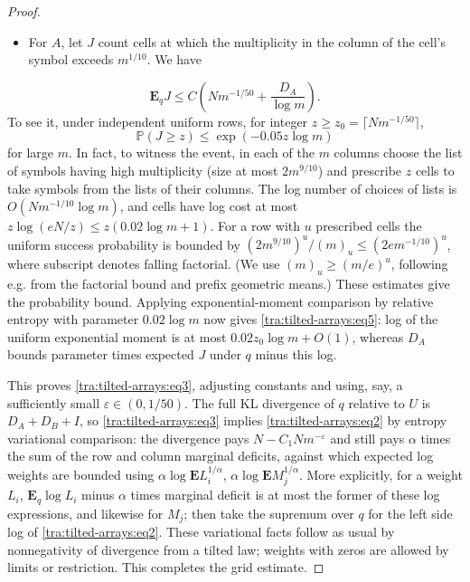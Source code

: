 \begin{proof}
\begin{itemize}
\item For \(A\), let \(J\) count cells at which the multiplicity in the column of the cell's symbol exceeds \(m^{1/10}\). We have
\end{itemize}
\begin{equation}
 \mathbf E_q J\le C\left(Nm^{-1/50}+\frac{D_A}{\log m}\right). \label{tra:tilted-arrays:eq5}
\end{equation}
To see it, under independent uniform rows, for integer \(z\ge z_0=\lceil N m^{-1/50}\rceil\),
\[
 \mathbb P(J\ge z)\le \exp(-0.05 z\log m)
\]
for large \(m\). In fact, to witness the event, in each of the \(m\) columns choose the list of symbols having high multiplicity (size at most \(2m^{9/10}\)) and prescribe \(z\) cells to take symbols from the lists of their columns. The log number of choices of lists is \(O(Nm^{-1/10}\log m)\), and cells have log cost at most \(z\log(eN/z)\le z(0.02\log m+1)\). For a row with \(u\) prescribed cells the uniform success probability is bounded by
\((2m^{9/10})^u/(m)_u\le (2e m^{-1/10})^u\), where subscript denotes falling factorial. (We use \((m)_u\ge (m/e)^u\), following e.g. from the factorial bound and prefix geometric means.) These estimates give the probability bound. Applying exponential-moment comparison by relative entropy with parameter \(0.02\log m\) now gives \eqref{tra:tilted-arrays:eq5}: log of the uniform exponential moment is at most \(0.02 z_0\log m+O(1)\), whereas \(D_A\) bounds parameter times expected \(J\) under \(q\) minus this log.

This proves \eqref{tra:tilted-arrays:eq3}, adjusting constants and using, say, a sufficiently small \(\varepsilon\in(0,1/50)\). The full KL divergence of \(q\) relative to \(U\) is \(D_A+D_B+I\), so \eqref{tra:tilted-arrays:eq3} implies \eqref{tra:tilted-arrays:eq2} by entropy variational comparison: the divergence pays \(N-C_1 N m^{-\varepsilon}\) and still pays \(\alpha\) times the sum of the row and column marginal deficits, against which expected log weights are bounded using \(\alpha\log\mathbf E L_i^{1/\alpha}\), \(\alpha\log\mathbf E M_j^{1/\alpha}\). More explicitly, for a weight \(L_i\),
\(\mathbf E_q\log L_i\) minus \(\alpha\) times marginal deficit is at most the former of these log expressions, and likewise for \(M_j\); then take the supremum over \(q\) for the left side log of \eqref{tra:tilted-arrays:eq2}. These variational facts follow as usual by nonnegativity of divergence from a tilted law; weights with zeros are allowed by limits or restriction. This completes the grid estimate.
\end{proof}
